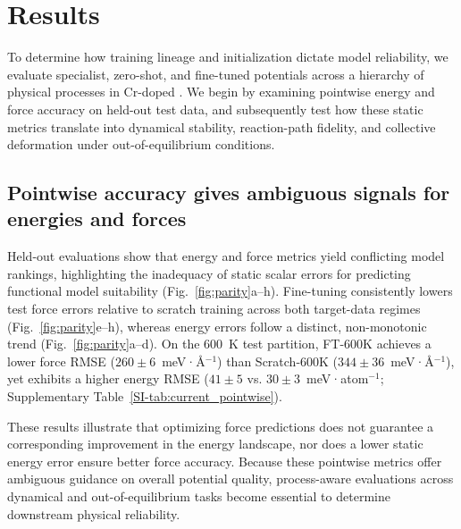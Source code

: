 \documentclass[pdflatex,sn-mathphys-num]{sn-jnl}
\newcommand{\sitab}[1]{Supplementary Table~\ref{SI-#1}}
\begin{document}
\section{Results}\label{sec:results}
To determine how training lineage and initialization dictate model reliability, we evaluate specialist, zero-shot, and fine-tuned potentials across a hierarchy of physical processes in Cr-doped . We begin by examining pointwise energy and force accuracy on held-out test data, and subsequently test how these static metrics translate into dynamical stability, reaction-path fidelity, and collective deformation under out-of-equilibrium conditions.

\subsection{Pointwise accuracy gives ambiguous signals for energies and forces}\label{sec:pointwise}
Held-out evaluations show that energy and force metrics yield conflicting model rankings, highlighting the inadequacy of static scalar errors for predicting functional model suitability (Fig.~\ref{fig:parity}a--h). Fine-tuning consistently lowers test force errors relative to scratch training across both target-data regimes (Fig.~\ref{fig:parity}e--h), whereas energy errors follow a distinct, non-monotonic trend (Fig.~\ref{fig:parity}a--d). On the 600~K test partition, FT-600K achieves a lower force RMSE ($260\pm6$~meV·\AA$^{-1}$) than Scratch-600K ($344\pm36$~meV·\AA$^{-1}$), yet exhibits a higher energy RMSE ($41\pm5$ vs. $30\pm3$~meV·atom$^{-1}$; \sitab{tab:current_pointwise}). 

These results illustrate that optimizing force predictions does not guarantee a corresponding improvement in the energy landscape, nor does a lower static energy error ensure better force accuracy. Because these pointwise metrics offer ambiguous guidance on overall potential quality, process-aware evaluations across dynamical and out-of-equilibrium tasks become essential to determine downstream physical reliability.
\end{document}
